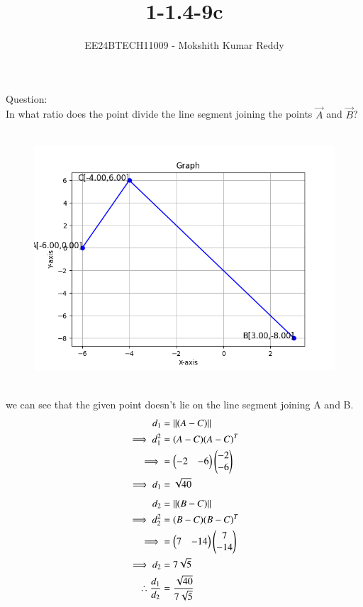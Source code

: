 \documentclass[journal]{IEEEtran}
\begin{document}

\vspace{3cm}

\title{1-1.4-9c}
\author{EE24BTECH11009 - Mokshith Kumar Reddy}
{\let\newpage\relax\maketitle}

\renewcommand{\thefigure}{\theenumi}
\renewcommand{\thetable}{\theenumi}
\setlength{\intextsep}{10pt} %


\renewcommand{\thetable}{\theenumi}
Question:\\
 In what ratio does the point  divide the line segment joining the points $\vec{A}$ and $\vec{B}$?\\
\solution\\
\begin{figure}[h!]
   \centering
   \includegraphics[width=0.7\linewidth]{figs/plot.png}
   \caption{ }
   \label{stemplot}
\end{figure}\\
 we can see that the given point doesn't lie on the line segment joining A and B.\\
\begin{align}
d_1&=\left\|{(A-C)}\right\|\\
\implies d_1^2&= (A-C)(A-C)^T\\
\implies &=\begin{pmatrix}
-2 & -6
\end{pmatrix}
\begin{pmatrix}
-2\\
-6
\end{pmatrix}\\
\implies d_1&=\sqrt{40}\\
\end{align}
\begin{align}
d_2&=\left\|{(B-C)}\right\|\\
\implies d_2^2&=(B-C)(B-C)^T\\
 \implies &=\begin{pmatrix}
7 & -14
\end{pmatrix}
\begin{pmatrix}
7\\
-14
\end{pmatrix}\\
\implies d_2&=7\sqrt{5}\\
\therefore \frac{d_1}{d_2} &= \frac{\sqrt{40}}{7\sqrt{5}}
\end{align}
\begin{table}[h]
    \centering
    
    \caption{  }
    \label{tab.1}
\end{table}
\end{document}
